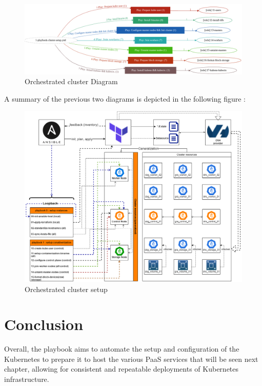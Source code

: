 \begin{figure}[H]\centering
\includegraphics[width=1.0\textwidth,angle=00]{assets/f18.png}
\caption{Orchestrated cluster Diagram}
\label{fig:fig18}
\end{figure}

A summary of the previous two diagrams is depicted in the following figure :

\begin{figure}[H]\centering
\includegraphics[width=1.0\textwidth,angle=00]{assets/f19.png}
\caption{Orchestrated cluster setup}
\label{fig:Orchestrated cluster setup}
\end{figure}

\section*{Conclusion}


Overall, the playbook aims to automate the setup and configuration of the Kubernetes to prepare it to host the various PaaS services that will be seen next chapter, allowing for consistent and repeatable deployments of Kubernetes infrastructure.

